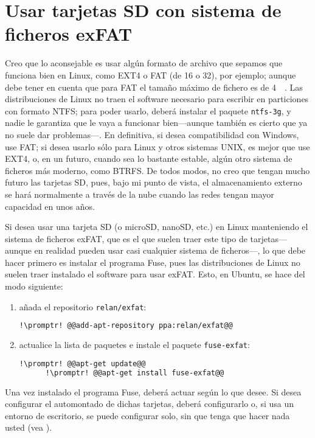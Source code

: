 \section{Usar tarjetas SD con sistema de ficheros exFAT}\label{sec:exfat}
Creo que lo aconsejable es usar algún formato de archivo que sepamos que funciona bien en Linux, como EXT4 o FAT
(de \num{16} o \SI{32}{\bit}), por ejemplo; aunque debe tener en cuenta que para FAT el tamaño máximo de fichero
es de \SI{4}{\gibi\byte}. Las distribuciones de Linux no traen el software necesario para escribir en
particiones con formato NTFS; para poder usarlo, deberá instalar el paquete \lstinline!ntfs-3g!, y nadie le
garantiza que le vaya a funcionar bien---aunque también es cierto que ya no suele dar problemas---. En
definitiva, si desea compatibilidad con Windows, use FAT; si desea usarlo sólo para Linux y otros sistemas UNIX,
es mejor que use EXT4, o, en un futuro, cuando sea lo bastante estable, algún otro sistema de ficheros más
moderno, como BTRFS. De todos modos, no creo que tengan mucho futuro las tarjetas SD, pues, bajo mi punto de
vista, el almacenamiento externo se hará normalmente a través de la nube cuando las redes tengan mayor capacidad
en unos años.

Si desea usar una tarjeta SD (o microSD, nanoSD, etc.) en Linux manteniendo el sistema de ficheros exFAT, que es
el que suelen traer este tipo de tarjetas---aunque en realidad pueden usar casi cualquier sistema de
ficheros---, lo que debe hacer primero es instalar el programa Fuse, pues las distribuciones de Linux no suelen
traer instalado el software para usar exFAT. Esto, en Ubuntu, se hace del modo siguiente:

\begin{enumerate}

  \item añada el repositorio \lstinline!relan/exfat!:

    \begin{lstlisting}[gobble=6,language=bash,style=bashinteract,escapechar=!]
      !\promptr! @@add-apt-repository ppa:relan/exfat@@
    \end{lstlisting}

  \item actualice la lista de paquetes e instale el paquete \lstinline+fuse-exfat+:

    \begin{lstlisting}[gobble=6,language=bash,style=bashinteract,escapechar=!]
      !\promptr! @@apt-get update@@
      !\promptr! @@apt-get install fuse-exfat@@
    \end{lstlisting}

\end{enumerate}

Una vez instalado el programa Fuse, deberá actuar según lo que desee. Si desea configurar el automontado de
dichas tarjetas, deberá configurarlo o, si usa un entorno de escritorio, se puede configurar solo, sin que tenga
que hacer nada usted (vea ).
